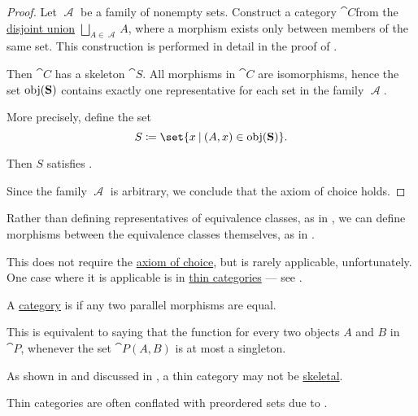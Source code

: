 \begin{proof}
  Let \( \mscrA \) be a family of nonempty sets. Construct a category \( \cat{C} \)from the \hyperref[def:disjoint_union]{disjoint union} \( \bigsqcup_{A \in \mscrA} A \), where a morphism exists only between members of the same set. This construction is performed in detail in the proof of .

  Then \( \cat{C} \) has a skeleton \( \cat{S} \). All morphisms in \( \cat{C} \) are isomorphisms, hence the set \( \operatorname{obj}(\operatorname{\mathbf{S}}) \) contains exactly one representative for each set in the family \( \mscrA \).

  More precisely, define the set
  \begin{equation*}
    S \coloneqq \set{ x \given (A, x) \in \obj(\cat{S}) }.
  \end{equation*}

  Then \( S \) satisfies .

  Since the family \( \mscrA \) is arbitrary, we conclude that the axiom of choice holds.
\end{proof}

\begin{remark}\label{rem:skeletons_and_thin_categories}
  Rather than defining representatives of equivalence classes, as in , we can define morphisms between the equivalence classes themselves, as in .

  This does not require the \hyperref[def:zfc/choice]{axiom of choice}, but is rarely applicable, unfortunately. One case where it is applicable is in \hyperref[def:thin_category]{thin categories} --- see .
\end{remark}

\begin{definition}\label{def:thin_category}
  A \hyperref[def:category]{category} is  if any two parallel morphisms are equal.

  This is equivalent to saying that the function for every two objects \( A \) and \( B \) in \( \cat{P} \), whenever the set \( \cat{P}(A, B) \) is at most a singleton.

  As shown in  and discussed in , a thin category may not be \hyperref[def:skeletal_category]{skeletal}.

  Thin categories are often conflated with preordered sets due to .
\end{definition}

